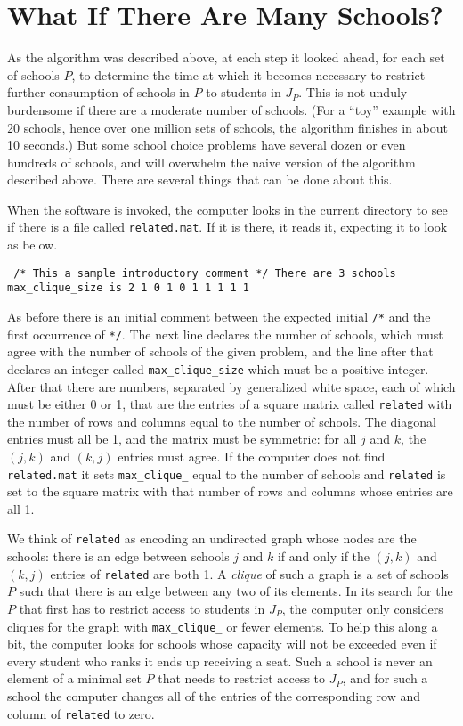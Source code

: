 \documentclass[12pt]{article}
\theoremstyle{definition}
\begin{document}
\section{What If There Are Many Schools?}

As the algorithm was described above, at each step it looked ahead,
for each set of schools $P$, to determine the time at which it becomes
necessary to restrict further consumption of schools in $P$ to
students in $J_P$.  This is not unduly burdensome if there are a
moderate number of schools.  (For a ``toy'' example with 20 schools,
hence over one million sets of schools, the algorithm finishes in
about 10 seconds.)  But some school choice problems have several dozen
or even hundreds of schools, and will overwhelm the naive version of
the algorithm described above.  There are several things that can be
done about this.

When the software is invoked, the computer looks in the current
directory to see if there is a file called \texttt{related.mat}.  If
it is there, it reads it, expecting it to look as below.
\begin{obeylines}\texttt{
/* This a sample introductory comment */
There are 3 schools
max\_clique\_size is 2
1 0 1
0 1 1
1 1 1
}
\end{obeylines} \noindent
As before there is an initial comment between the expected initial
\texttt{/*} and the first occurrence of \texttt{*/}.  The next line
declares the number of schools, which must agree with the number of
schools of the given problem, and the line after that declares an
integer called \texttt{max\_clique\_size} which must be a positive
integer.  After that there are numbers, separated by generalized white
space, each of which must be either 0 or 1, that are the entries of a
square matrix called \texttt{related} with the number of rows and
columns equal to the number of schools.  The diagonal entries must all
be 1, and the matrix must be symmetric: for all $j$ and $k$, the
$(j,k)$ and $(k,j)$ entries must agree.  If the computer does not find
\texttt{related.mat} it sets \texttt{max\_clique\_} equal to the
number of schools and \texttt{related} is set to the square matrix
with that number of rows and columns whose entries are all 1.

We think of \texttt{related} as encoding an undirected graph whose
nodes are the schools: there is an edge between schools $j$ and $k$ if
and only if the $(j,k)$ and $(k,j)$ entries of \texttt{related} are
both 1. A \emph{clique} of such a graph is a set of schools $P$ such
that there is an edge between any two of its elements.  In its search
for the $P$ that first has to restrict access to students in $J_P$,
the computer only considers cliques for the graph with
\texttt{max\_clique\_} or fewer elements.  To help this along a bit, the
computer looks for schools whose capacity will not be exceeded even if
every student who ranks it ends up receiving a seat.  Such a school is
never an element of a minimal set $P$ that needs to restrict access to
$J_P$, and for such a school the computer changes all of the entries
of the corresponding row and column of \texttt{related} to zero.
\end{document}
